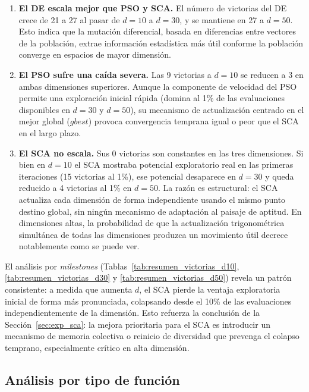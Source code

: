 \documentclass[12pt,a4paper]{article}
\begin{document}
\begin{enumerate}
    \item \textbf{El DE escala mejor que PSO y SCA.} El número de victorias del DE crece de 21 a 27 al pasar de $d=10$ a $d=30$, y se mantiene en 27 a $d=50$. Esto indica que la mutación diferencial, basada en diferencias entre vectores de la población, extrae información estadística más útil conforme la población converge en espacios de mayor dimensión.
 
    \item \textbf{El PSO sufre una caída severa.} Las 9 victorias a $d=10$ se reducen a 3 en ambas dimensiones superiores. Aunque la componente de velocidad del PSO permite una exploración inicial rápida (domina al 1\% de las evaluaciones disponibles en $d=30$ y $d=50$), su mecanismo de actualización centrado en el mejor global ($gbest$) provoca convergencia temprana igual o peor que el SCA en el largo plazo.
 
    \item \textbf{El SCA no escala.} Sus 0 victorias son constantes en las tres dimensiones. Si bien en $d=10$ el SCA mostraba potencial exploratorio real en las primeras iteraciones (15 victorias al 1\%), ese potencial desaparece en $d=30$ y queda reducido a 4 victorias al 1\% en $d=50$. La razón es estructural: el SCA actualiza cada dimensión de forma independiente usando el mismo punto destino global, sin ningún mecanismo de adaptación al paisaje de aptitud. En dimensiones altas, la probabilidad de que la actualización trigonométrica simultánea de todas las dimensiones produzca un movimiento útil decrece notablemente como se puede ver.
\end{enumerate}
 
El análisis por \textit{milestones} (Tablas~\ref{tab:resumen_victorias_d10}, \ref{tab:resumen_victorias_d30} y \ref{tab:resumen_victorias_d50}) revela un patrón consistente: a medida que aumenta $d$, el SCA pierde la ventaja exploratoria inicial de forma más pronunciada, colapsando desde el 10\% de las evaluaciones independientemente de la dimensión. Esto refuerza la conclusión de la Sección~\ref{sec:exp_sca}: la mejora prioritaria para el SCA es introducir un mecanismo de memoria colectiva o reinicio de diversidad que prevenga el colapso temprano, especialmente crítico en alta dimensión.

\subsection{Análisis por tipo de función}
\label{sec:analisis_tipo_funcion}
\end{document}
